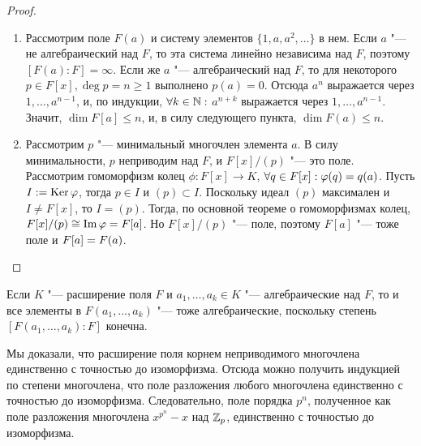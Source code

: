\begin{proof}~
	\begin{enumerate}
		\item Рассмотрим поле $F(a)$ и систему элементов $\{1, a, a^2, \dotsc\}$ в нем. Если $a$ "--- не алгебраический над $F$, то эта система линейно независима над $F$, поэтому $[F(a) : F] = \infty$. Если же $a$ "--- алгебраический над $F$, то для некоторого $p \in F[x], \deg{p} = n \ge 1$ выполнено $p(a) = 0$. Отсюда $a^n$ выражается через $1, \dotsc, a^{n-1}$, и, по индукции, $\forall k \in \mathbb{N}:$ $a^{n + k}$ выражается через $1, \dotsc, a^{n-1}$. Значит, $\dim{F[a]} \le n$, и, в силу следующего пункта, $\dim{F(a)} \le n$.
		\item Рассмотрим $p$ "--- минимальный многочлен элемента $a$. В силу минимальности, $p$ неприводим над $F$, и $F[x] / (p)$ "--- это поле. Рассмотрим гомоморфизм колец $\phi: F[x] \to K$, $\forall q \in F[x]: \phi(q) \hm= q(a)$. Пусть $I := \operatorname{Ker}\varphi$, тогда $p \in I$ и $(p) \subset I$. Поскольку идеал $(p)$ максимален и $I \ne F[x]$, то $I = (p)$. Тогда, по основной теореме о гомоморфизмах колец, $F[x] / (p) \cong \operatorname{Im}\varphi = F[a]$. Но $F[x] / (p)$ "--- поле, поэтому $F[a]$ "--- тоже поле и $F[a] \hm= F(a)$.
	\end{enumerate}
\end{proof}

\begin{corollary}
	Если $K$ "--- расширение поля $F$ и $a_1, \dotsc, a_k \in K$ "--- алгебраические над $F$, то и все элементы в $F(a_1, \dotsc, a_k)$ "--- тоже алгебраические, поскольку степень $[F(a_1, \dotsc, a_k) : F]$ конечна.
\end{corollary}

\begin{note}
	Мы доказали, что расширение поля корнем неприводимого многочлена единственно с точностью до изоморфизма. Отсюда можно получить индукцией по степени многочлена, что поле разложения любого многочлена единственно с точностью до изоморфизма. Следовательно, поле порядка $p^n$, полученное как поле разложения многочлена $x^{p^n} - x$ над $\mathbb{Z}_p$, единственно с точностью до изоморфизма.
\end{note}